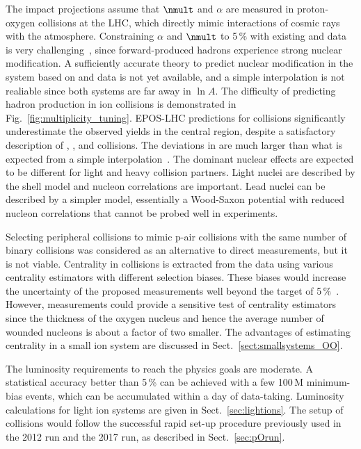 \documentclass[../report.tex]{subfiles}
\begin{document}
The impact projections assume that $\nmult$ and $\alpha$ are measured in proton-oxygen collisions at the LHC, which directly mimic interactions of cosmic rays with the atmosphere. Constraining $\alpha$ and $\nmult$ to 5\,\% with existing \pp and \pPb data is very challenging~\cite{dEnterria:2018kcz}, since forward-produced hadrons experience strong nuclear modification\cite{Aaij:2017cqq,Acharya:2018qsh,Adriani:2015iwv}. A sufficiently accurate theory to predict nuclear modification in the \pO system based on \pp and \pPb data is not yet available, and a simple interpolation is not realiable since both systems are far away in $\ln A$.
The difficulty of predicting hadron production in ion collisions is demonstrated in Fig.~\ref{fig:multiplicity_tuning}. EPOS-LHC predictions for \XeXe collisions significantly underestimate the observed yields in the central region, despite a satisfactory description of \pp, \pPb, and \PbPb collisions. The deviations in \XeXe are much larger than what is expected from a simple interpolation~\cite{Kim:2018ink}. The dominant nuclear effects are expected to be different for light and heavy collision partners. Light nuclei are described by the shell model and nucleon correlations are important. Lead nuclei can be described by a simpler model, essentially a Wood-Saxon potential with reduced nucleon correlations that cannot be probed well in experiments.

Selecting peripheral \pPb collisions to mimic p-air collisions with the same number of binary collisions was considered as an alternative to direct \pO measurements, but it is not viable. Centrality in \pPb collisions is extracted from the data using various centrality estimators with different selection biases. These biases would increase the uncertainty of the proposed measurements well beyond the target of 5\,\%~\cite{Adam:2014qja}. However, \pO measurements could provide a sensitive test of centrality estimators since the thickness of the oxygen nucleus and hence the average number of wounded nucleons is about a factor of two smaller. The advantages of estimating centrality in a small ion system are discussed in Sect.~\ref{sect:smallsystems_OO}.

The luminosity requirements to reach the physics goals are moderate. A statistical accuracy better than 5\,\% can be achieved with a few 100\,M minimum-bias events, which can be accumulated within a day of data-taking. Luminosity calculations for light ion systems are given in Sect.\ \ref{sec:lightions}. The setup of \pO collisions would follow the successful rapid set-up procedure previously used in the 2012 \pPb run and the 2017 \XeXe run, as described in Sect.~\ref{sec:pOrun}.
\end{document}
